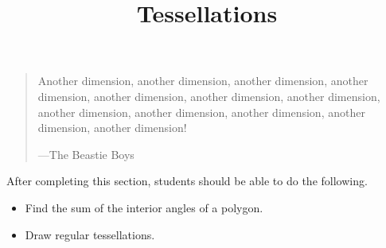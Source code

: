 \documentclass{ximera}
\title{Tessellations}
\begin{document}
\begin{abstract}
\end{abstract}
\maketitle

\begin{quote}
Another dimension, another dimension, another dimension, another
dimension, another dimension, another dimension, another dimension,
another dimension, another dimension, another dimension, another
dimension, another dimension!  

\hfill---The Beastie Boys

\end{quote}


After completing this section, students should be able to do the following.

\begin{itemize}
\item Find the sum of the interior angles of a polygon.
\item Draw regular tessellations.
\end{itemize}
\end{document}
